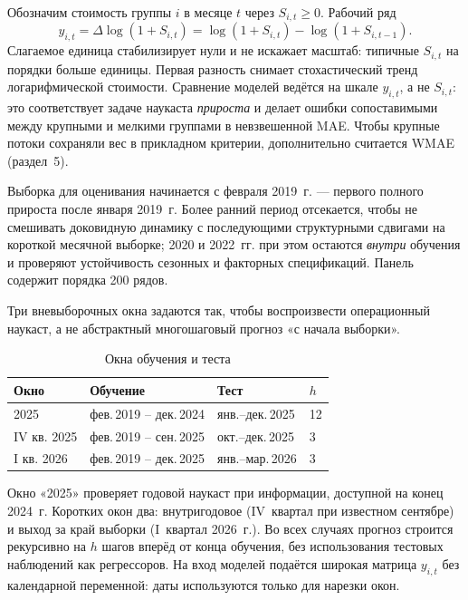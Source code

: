 \documentclass[12pt]{article}
\begin{document}
Обозначим стоимость группы $i$ в месяце $t$ через $S_{i,t}\ge 0$. Рабочий ряд
\begin{equation}
\label{eq:transform}
y_{i,t} = \Delta \log(1+S_{i,t}) = \log(1+S_{i,t}) - \log(1+S_{i,t-1}).
\end{equation}
Слагаемое единица стабилизирует нули и не искажает масштаб: типичные $S_{i,t}$ на порядки больше единицы. Первая разность снимает стохастический тренд логарифмической стоимости. Сравнение моделей ведётся на шкале $y_{i,t}$, а не $S_{i,t}$: это соответствует задаче наукаста \emph{прироста} и делает ошибки сопоставимыми между крупными и мелкими группами в невзвешенной MAE. Чтобы крупные потоки сохраняли вес в прикладном критерии, дополнительно считается WMAE (раздел~5).

Выборка для оценивания начинается с февраля 2019~г. --- первого полного прироста после января 2019~г. Более ранний период отсекается, чтобы не смешивать доковидную динамику с последующими структурными сдвигами на короткой месячной выборке; 2020 и 2022~гг. при этом остаются \emph{внутри} обучения и проверяют устойчивость сезонных и факторных спецификаций. Панель содержит порядка 200 рядов.

Три вневыборочных окна задаются так, чтобы воспроизвести операционный наукаст, а не абстрактный многошаговый прогноз «с начала выборки».

\begin{table}[htbp]
\centering
\caption{Окна обучения и теста}
\label{tab:windows}
\begin{tabular}{llll}
\toprule
Окно & Обучение & Тест & $h$ \\
\midrule
2025 & фев.\,2019 -- дек.\,2024 & янв.--дек.\,2025 & 12 \\
IV кв. 2025 & фев.\,2019 -- сен.\,2025 & окт.--дек.\,2025 & 3 \\
I кв. 2026 & фев.\,2019 -- дек.\,2025 & янв.--мар.\,2026 & 3 \\
\bottomrule
\end{tabular}
\end{table}

Окно «2025» проверяет годовой наукаст при информации, доступной на конец 2024~г. Коротких окон два: внутригодовое (IV~квартал при известном сентябре) и выход за край выборки (I~квартал 2026~г.). Во всех случаях прогноз строится рекурсивно на $h$ шагов вперёд от конца обучения, без использования тестовых наблюдений как регрессоров. На вход моделей подаётся широкая матрица $y_{i,t}$ без календарной переменной: даты используются только для нарезки окон.
\end{document}

